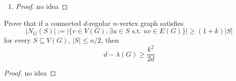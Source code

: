 \documentclass[a4paper, 11pt, oneside]{article}
\newenvironment{problem}[1]
  {\renewcommand\theinnercustomprob{#1}\innercustomprob}
  {\endinnercustomprob}
\newcommand\abs[1]{\left|#1\right|}
\begin{document}
\begin{enumerate}
\begin{proof}
	\color{red} maybe same as above

\end{proof}

 \item
   \begin{proof}

		\color{red} no idea

\end{proof}
 \end{enumerate}
		

 \begin{problem}{8}\label{problem8}
 Prove that if a connected $d$-regular $n$-vertex graph satisfies
 \begin{equation*}
\abs{N_G(S)} := \abs{\{ v \in V(G) : \exists u \in S \text{ s.t. } uv\in E(G)\}} \geq (1 + k)\abs{S}
\end{equation*}
for every $S \subseteq V(G)$, $\abs{S} \leq n/2$, then
 \begin{equation*}
d - \lambda(G) \geq \frac{k^2}{2d}
\end{equation*}
\end{problem}
\begin{proof}

\color{red} no idea

\end{proof}		
\end{document}
